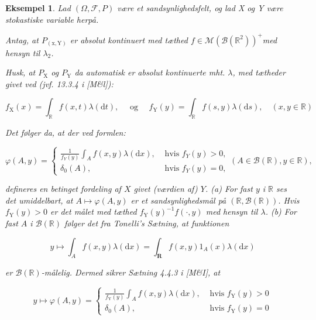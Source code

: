 \documentclass{article}
\newcommand{\1}{\mathbbm{1}}
\theoremstyle{boxed}
\newtheorem{example}[theorem]{Eksempel}
\begin{document}
\begin{example}
    Lad $(\Omega, \mathcal{F}, P)$ være et sandsynlighedsfelt, og lad X og Y være stokastiske variable herpå.

Antag, at $P_{(\mathrm{x}, \mathrm{Y})}$ er absolut kontinuert med tæthed $f \in \mathcal{M}\left(\mathcal{B}\left(\mathbb{R}^2\right)\right)^{+}$med hensyn til $\lambda_2$.

Husk, at $P_{\mathrm{X}}$ og $P_{\mathrm{Y}}$ da automatisk er absolut kontinuerte mht. $\lambda$, med tætheder givet ved (jvf. 13.3.4 i [M\&l]):

$$
f_{\mathrm{X}}(x)=\int_{\mathbb{R}} f(x, t) \lambda(\mathrm{d} t), \quad \text { og } \quad f_{\mathrm{Y}}(y)=\int_{\mathbb{R}} f(s, y) \lambda(\mathrm{d} s), \quad(x, y \in \mathbb{R})
$$


Det følger da, at der ved formlen:

$$
\varphi(A, y)=\left\{\begin{array}{ll}
\frac{1}{f_Y(y)} \int_A f(x, y) \lambda(\mathrm{d} x), & \text { hvis } f_Y(y)>0, \\
\delta_0(A), & \text { hvis } f_Y(y)=0,
\end{array}(A \in \mathcal{B}(\mathbb{R}), y \in \mathbb{R}),\right.
$$

defineres en betinget fordeling af $X$ givet (værdien af) $Y$.
(a) For fast $y$ i $\mathbb{R}$ ses det umiddelbart, at $A \mapsto \varphi(A, y)$ er et sandsynlighedsmål på $(\mathbb{R}, \mathcal{B}(\mathbb{R}))$. Hvis $f_{\mathrm{Y}}(y)>0$ er det målet med tæthed $f_{\mathrm{Y}}(y)^{-1} f(\cdot, y)$ med hensyn til $\lambda$.
(b) For fast $A$ i $\mathcal{B}(\mathbb{R})$ følger det fra Tonelli's Sætning, at funktionen

$$
y \mapsto \int_A f(x, y) \lambda(\mathrm{d} x)=\int_{\mathbf{R}} f(x, y) 1_A(x) \lambda(\mathrm{d} x)
$$

er $\mathcal{B}(\mathbb{R})$-målelig.
Dermed sikrer Sætning 4.4.3 i [M\&I], at

$$
y \mapsto \varphi(A, y)= \begin{cases}\frac{1}{f_{\mathrm{Y}}(y)} \int_A f(x, y) \lambda(\mathrm{d} x), & \text { hvis } f_{\mathrm{Y}}(y)>0 \\ \delta_0(A), & \text { hvis } f_{\mathrm{Y}}(y)=0\end{cases}
$$


\end{example}
\end{document}
